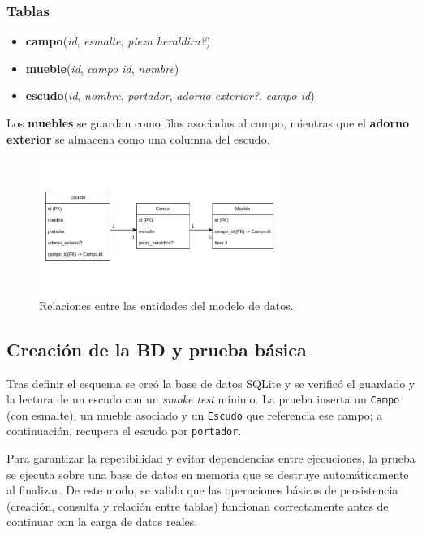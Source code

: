 \subsubsection{Tablas}
\begin{itemize}
    \item \textbf{campo}(\textit{id}, \textit{esmalte}, \textit{pieza heraldica?})
    \item \textbf{mueble}(\textit{id}, \textit{campo id}, \textit{nombre})
    \item \textbf{escudo}(\textit{id}, \textit{nombre}, \textit{portador}, \textit{adorno exterior?}, \textit{campo id})
\end{itemize}

Los \textbf{muebles} se guardan como filas asociadas al campo, mientras que el \textbf{adorno exterior} 
se almacena como una columna del escudo.

\begin{figure}[H]
    \centering
    \includegraphics[width=0.7\textwidth]{figuras/diagramaBD.jpg}
    \caption{Relaciones entre las entidades del modelo de datos.}
    \label{fig:diagrama-bd}
\end{figure}

\subsection{Creación de la BD y prueba básica}
Tras definir el esquema se creó la base de datos SQLite y se verificó el guardado y la lectura de un escudo con un 
\emph{smoke test} mínimo. La prueba inserta un \texttt{Campo} (con esmalte), un mueble asociado y un \texttt{Escudo} que 
referencia ese campo; a continuación, recupera el escudo por \texttt{portador}. 

Para garantizar la repetibilidad y evitar dependencias entre ejecuciones, la prueba se ejecuta sobre una base de datos 
en memoria que se destruye automáticamente al finalizar. De este modo, se valida que las operaciones básicas de 
persistencia (creación, consulta y relación entre tablas) funcionan correctamente antes de continuar con la carga 
de datos reales.

